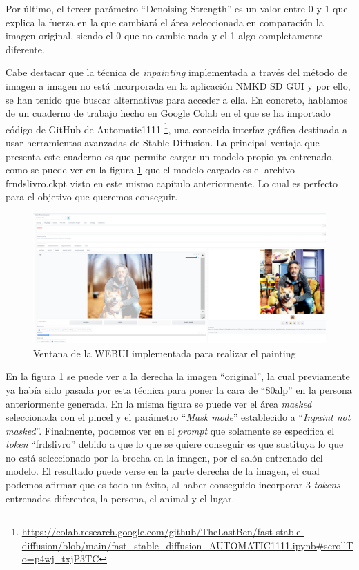 \begin{itemize}
Por último, el tercer parámetro ``Denoising Strength'' es un valor entre 0 y 1 que explica la fuerza en la que cambiará el área seleccionada en comparación la imagen original, siendo el 0 que no cambie nada y el 1 algo completamente diferente. 

Cabe destacar que la técnica de \textit{inpainting} implementada a través del método de imagen a imagen no está incorporada en la aplicación NMKD SD GUI y por ello, se han tenido que buscar alternativas para acceder a ella. En concreto, hablamos de un cuaderno de trabajo hecho en Google Colab en el que se ha importado código de GitHub de Automatic1111 \footnote{\url{https://colab.research.google.com/github/TheLastBen/fast-stable-diffusion/blob/main/fast_stable_diffusion_AUTOMATIC1111.ipynb#scrollTo=p4wj_txjP3TC}}, una conocida interfaz gráfica destinada a usar herramientas avanzadas de Stable Diffusion. La principal ventaja que presenta este cuaderno es que permite cargar un modelo propio ya entrenado, como se puede ver en la figura \ref{fig:inpainting1} que el modelo cargado es el archivo frndslivro.ckpt visto en este mismo capítulo anteriormente. Lo cual es perfecto para el objetivo que queremos conseguir. 

\begin{figure}[h]
	\centering
	\includegraphics[width = 1
	\textwidth]{Imagenes/Vectorial/inpainting1.png}
	\caption{Ventana de la WEBUI implementada para realizar el painting}
	\label{fig:inpainting1}
\end{figure}

En la figura \ref{fig:inpainting1} se puede ver a la derecha la imagen ``original'', la cual previamente ya había sido pasada por esta técnica para poner la cara de ``80alp'' en la persona anteriormente generada. En la misma figura se puede ver el área \textit{masked} seleccionada con el pincel y el parámetro ``\textit{Mask mode}'' establecido a ``\textit{Inpaint not masked}''. Finalmente, podemos ver en el \textit{prompt} que solamente se especifica el \textit{token} ``frdslivro'' debido a que lo que se quiere conseguir es que sustituya lo que no está seleccionado por la brocha en la imagen, por el salón entrenado del modelo. El resultado puede verse en la parte derecha de la imagen, el cual podemos afirmar que es todo un éxito, al haber conseguido incorporar 3 \textit{tokens} entrenados diferentes, la persona, el animal y el lugar. 


\end{itemize}
